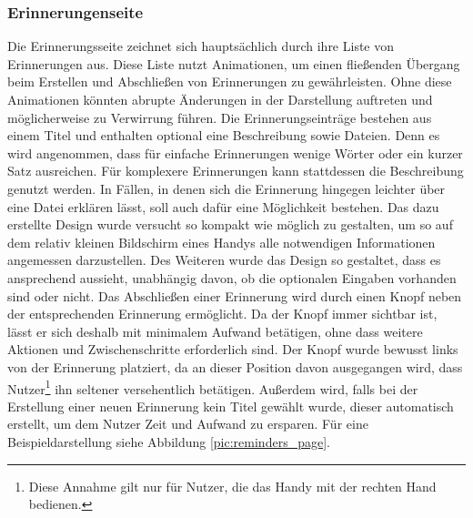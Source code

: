 \subsubsection{Erinnerungenseite}
Die Erinnerungsseite zeichnet sich hauptsächlich durch ihre Liste von Erinnerungen aus. Diese Liste nutzt Animationen, um einen fließenden Übergang beim Erstellen und Abschließen von Erinnerungen zu gewährleisten. Ohne diese Animationen könnten abrupte Änderungen in der Darstellung auftreten und möglicherweise zu Verwirrung führen.\newline%
Die Erinnerungseinträge bestehen aus einem Titel und enthalten optional eine Beschreibung sowie Dateien. %
	Denn es wird angenommen, dass für einfache Erinnerungen wenige Wörter oder ein kurzer Satz ausreichen. Für komplexere Erinnerungen kann stattdessen die Beschreibung genutzt werden. In Fällen, in denen sich die Erinnerung hingegen leichter über eine Datei erklären lässt, soll auch dafür eine Möglichkeit bestehen.\newline%
Das dazu erstellte Design wurde versucht so kompakt wie möglich zu gestalten, um so auf dem relativ kleinen Bildschirm eines Handys alle notwendigen Informationen angemessen darzustellen. %
	Des Weiteren wurde das Design so gestaltet, dass es ansprechend aussieht, unabhängig davon, ob die optionalen Eingaben vorhanden sind oder nicht.\newline%
Das Abschließen einer Erinnerung wird durch einen Knopf neben der entsprechenden Erinnerung ermöglicht. %
	Da der Knopf immer sichtbar ist, lässt er sich deshalb mit minimalem Aufwand betätigen, ohne dass weitere Aktionen und Zwischenschritte erforderlich sind. %
	Der Knopf wurde bewusst links von der Erinnerung platziert, da an dieser Position davon ausgegangen wird, dass Nutzer\footnote{Diese Annahme gilt nur für Nutzer, die das Handy mit der rechten Hand bedienen.} ihn seltener versehentlich betätigen.\newline%
Außerdem wird, falls bei der Erstellung einer neuen Erinnerung kein Titel gewählt wurde, dieser automatisch erstellt, um dem Nutzer Zeit und Aufwand zu ersparen.%
\newline%
Für eine Beispieldarstellung siehe Abbildung \ref{pic:reminders_page}.
%
%
